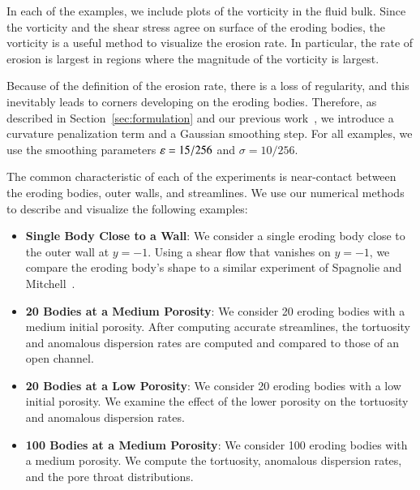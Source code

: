 \documentclass[preprint, 10pt]{elsarticle}
\begin{document}
In each of the examples, we include plots of the vorticity in the fluid
bulk.  Since the vorticity and the shear stress agree on surface of the
eroding bodies, the vorticity is a useful method to visualize the
erosion rate.  In particular, the rate of erosion is largest in regions
where the magnitude of the vorticity is largest.

Because of the definition of the erosion rate, there is a loss of
regularity, and this inevitably leads to corners developing on the
eroding bodies.  Therefore, as described in
Section~\ref{sec:formulation} and our previous work~\cite{qua-moo2018},
we introduce a curvature penalization term and a Gaussian smoothing
step.  For all examples, we use the smoothing parameters $\varepsilon=15/256$
and $\sigma=10/256$.

The common characteristic of each of the experiments is near-contact
between the eroding bodies, outer walls, and streamlines. We use our
numerical methods to describe and visualize the following examples:
\begin{itemize}
  \item{\bf Single Body Close to a Wall}: We consider a single eroding
  body close to the outer wall at $y=-1$.  Using a shear flow that
  vanishes on $y=-1$, we compare the eroding body's shape to a similar
  experiment of Spagnolie and Mitchell~\cite{mit-spa2017}.

  \item{\bf 20 Bodies at a Medium Porosity}: We consider 20 eroding
  bodies with a medium initial porosity.  After computing accurate
  streamlines, the tortuosity and anomalous dispersion rates are
  computed and compared to those of an open channel.

  \item{\bf 20 Bodies at a Low Porosity}: We consider 20 eroding bodies
  with a low initial porosity.  We examine the effect of the lower
  porosity on the tortuosity and anomalous dispersion rates.

  \item{\bf 100 Bodies at a Medium Porosity}: We consider 100 eroding
  bodies with a medium porosity.  We compute the tortuosity, anomalous
  dispersion rates, and the pore throat distributions.
\end{itemize}


\end{document}
